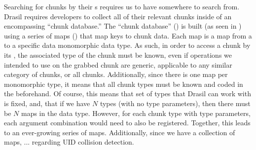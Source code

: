 Searching for chunks by their \UID{}s requires us to have somewhere to search
from. Drasil requires developers to collect all of their relevant chunks inside
of an encompassing ``chunk database.'' The ``chunk database'' (\ChunkDB{}) is
built (as seen in ) using a series of maps
() that map \UID{} keys to chunk data. Each
map is a map from a \UID{} to a specific data monomorphic data type. As such, in
order to access a chunk by its \UID{}, the associated type of the chunk must be
known, even if operations we intended to use on the grabbed chunk are generic,
applicable to any similar category of chunks, or all chunks. Additionally, since
there is one map per monomorphic type, it means that all chunk types must be
known and coded in the \ChunkDB{} beforehand. Of course, this means that set of
types that Drasil can work with is fixed, and, that if we have \(N\) types (with
no type parameters), then there must be \(N\) maps in the \ChunkDB{} data type.
However, for each chunk type with type parameters, each argument combination
would need to also be registered. Together, this leads to an ever-growing series
of maps. Additionally, since we have a collection of maps, ... regarding UID
collision detection.






